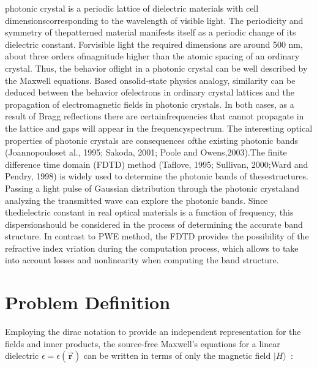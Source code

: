 \documentclass[journal,transmag]{IEEEtran}
\begin{document}
 photonic  crystal  is  a  periodic  lattice  of  dielectric  materials  with  cell  dimensionscorresponding to the wavelength of visible light. The periodicity and symmetry of thepatterned material manifests itself as a periodic change of its dielectric constant. Forvisible  light  the  required  dimensions  are  around  500 nm,  about  three  orders  ofmagnitude higher than the atomic spacing of an ordinary crystal. Thus, the behavior oflight in a photonic crystal can be well described by the Maxwell equations. Based onsolid-state  physics  analogy,  similarity  can  be  deduced  between  the  behavior  ofelectrons in ordinary crystal lattices and the propagation of electromagnetic fields in
photonic  crystals.  In  both  cases,  as  a  result  of  Bragg  reflections  there  are  certainfrequencies that cannot propagate in the lattice and gaps will appear in the frequencyspectrum. The interesting optical properties of photonic crystals are consequences ofthe existing photonic bands (Joannopouloset al., 1995; Sakoda, 2001; Poole and Owens,2003).The  finite  difference  time  domain  (FDTD) method (Taflove,  1995;  Sullivan, 2000;Ward  and  Pendry,  1998)  is  widely  used  to  determine  the  photonic  bands  of  thesestructures. Passing a light pulse of Gaussian distribution through the photonic crystaland  analyzing  the  transmitted  wave  can  explore  the  photonic  bands.  Since  thedielectric constant in real optical materials is a function of frequency, this dispersionshould be considered in the process of determining the accurate band structure.
In contrast to PWE method, the FDTD provides the possibility of the refractive index vriation during the computation process, which allows to take into account losses and nonlinearity when computing the band structure.


\section{Problem Definition}
Employing the dirac notation to provide an independent representation for the
fields and inner products, the source-free Maxwell's equations for a linear
dielectric $\epsilon=\epsilon(\vec{\bm{r}})$ can be written in terms of only
the magnetic field $|H\rangle$~\cite{joannopoulos_photonic_1997}:
\end{document}
